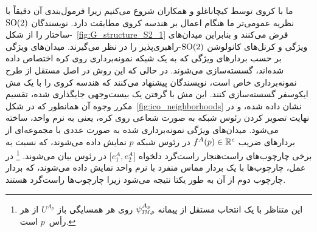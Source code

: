 ما با  کروی توسط کیچاناغلو و همکاران\cite{kicanaoglu2019gaugeSphere} شروع می‌کنیم زیرا فرمول‌بندی آن دقیقاً با نظریه عمومی‌تر ما هنگام اعمال بر هندسه کروی مطابقت دارد.
نویسندگان $\operatorname{SO}(2)$-ساختار را از شکل~\ref{fig:G_structure_S2_1} فرض می‌کنند و بنابراین میدان‌های ویژگی و کرنل‌های کانولوشن $\operatorname{SO}(2)$-راهبری‌پذیر را در نظر می‌گیرند.
میدان‌های ویژگی بر حسب بردارهای ویژگی که به یک شبکه نمونه‌برداری روی کره اختصاص داده شده‌اند، گسسته‌سازی می‌شوند.
در حالی که این روش در اصل مستقل از طرح نمونه‌برداری خاص است، نویسندگان پیشنهاد می‌کنند که هندسه کروی را با یک مش ایکوسفر گسسته‌سازی کنند.
این مش با گرفتن یک بیست‌وجهی جایگذاری شده، تقسیم مکرر وجوه آن همانطور که در شکل~\ref{fig:ico_neighborhoods} نشان داده شده، و در نهایت تصویر کردن رئوس شبکه به صورت شعاعی روی کره، یعنی به نرم واحد، ساخته می‌شود.
میدان‌های ویژگی نمونه‌برداری شده به صورت عددی با مجموعه‌ای از بردارهای ضریب $f^A(p) \in \mathbb{R}^c$ در رئوس شبکه $p$ نمایش داده می‌شوند، که نسبت به برخی چارچوب‌های راست‌هنجار راست‌گرد دلخواه $\big[e_1^A, e_2^A \big]$ در رئوس بیان می‌شوند.%
\footnote{
	این متناظر با یک انتخاب مستقل از پیمانه $\psiTMp^{A_p}$ روی هر همسایگی باز $U^{A_p}$ از هر رأس~$p$ است.
}
در عمل، چارچوب‌ها با یک بردار مماس منفرد با نرم واحد نمایش داده می‌شوند، که بردار چارچوب دوم از آن به طور یکتا نتیجه می‌شود زیرا چارچوب‌ها راست‌گرد هستند.


